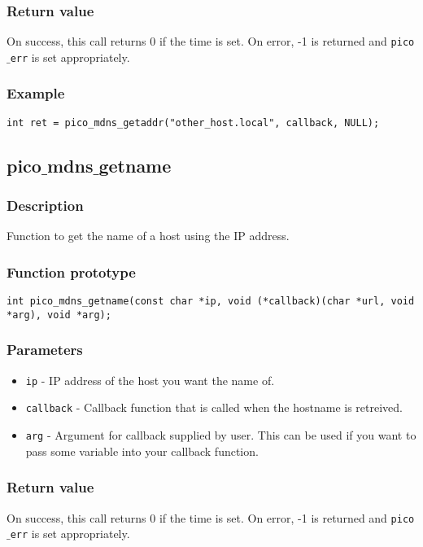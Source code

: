 \subsubsection*{Return value}
On success, this call returns 0 if the time is set.
On error, -1 is returned and \texttt{pico$\_$err} is set appropriately.

\subsubsection*{Example}
\begin{verbatim}
int ret = pico_mdns_getaddr("other_host.local", callback, NULL);
\end{verbatim}



\subsection{pico$\_$mdns$\_$getname}

\subsubsection*{Description}
Function to get the name of a host using the IP address.

\subsubsection*{Function prototype}
\begin{verbatim}
int pico_mdns_getname(const char *ip, void (*callback)(char *url, void *arg), void *arg);
\end{verbatim}

\subsubsection*{Parameters}
\begin{itemize}[noitemsep]
\item \texttt{ip} - IP address of the host you want the name of.
\item \texttt{callback} - Callback function that is called when the hostname is retreived.
\item \texttt{arg} - Argument for callback supplied by user. This can be used if you want to pass some variable into your callback function.
\end{itemize}

\subsubsection*{Return value}
On success, this call returns 0 if the time is set.
On error, -1 is returned and \texttt{pico$\_$err} is set appropriately.

